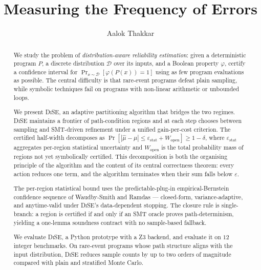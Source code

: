 \documentclass[runningheads]{llncs}
\newcommand{\dist}{\mathcal{D}}
\newcommand{\prog}{P}
\newcommand{\prop}{\varphi}
\newcommand{\mutrue}{\mu}
\newcommand{\muhat}{\hat{\mu}}
\newcommand{\Wopen}{W_{\mathrm{open}}}
\newcommand{\epsstat}{\varepsilon_{\mathrm{stat}}}
\newcommand{\toolname}{\textsc{DiSE}}
\begin{document}
\title{Measuring the Frequency of Errors}

\author{Aalok Thakkar}

\maketitle

\begin{abstract}
  We study the problem of \emph{distribution-aware reliability
    estimation}: given a deterministic program $\prog$, a discrete
  distribution $\dist$ over its inputs, and a Boolean property
  $\prop$, certify a confidence interval for
  $\Pr_{x \sim \dist}[\prop(\prog(x)) = 1]$ using as few program
  evaluations as possible.  The central difficulty is that
  rare-event programs defeat plain sampling, while symbolic
  techniques fail on programs with non-linear arithmetic or
  unbounded loops.

  We present \toolname{}, an adaptive partitioning algorithm that
  bridges the two regimes.
  \toolname{} maintains a frontier of path-condition regions and at
  each step chooses between sampling and SMT-driven refinement under
  a unified gain-per-cost criterion.  The certified half-width
  decomposes as
  $\Pr[|\muhat - \mutrue| \le \epsstat + \Wopen] \ge 1 - \delta$,
  where $\epsstat$ aggregates per-region statistical uncertainty and
  $\Wopen$ is the total probability mass of regions not yet
  symbolically certified.  This decomposition is both the organising
  principle of the algorithm and the content of its central
  correctness theorem: every action reduces one term, and the
  algorithm terminates when their sum falls below $\varepsilon$.

  The per-region statistical bound uses the predictable-plug-in
  empirical-Bernstein confidence sequence of Waudby-Smith and Ramdas
  --- closed-form, variance-adaptive, and anytime-valid under
  \toolname{}'s data-dependent stopping.  The closure rule is
  single-branch: a region is certified if and only if an SMT oracle
  proves path-determinism, yielding a one-lemma soundness contract
  with no sample-based fallback.

  We evaluate \toolname{}, a Python prototype with a
  Z3 backend, and evaluate it on $12$ integer benchmarks.  On
  rare-event programs whose path structure aligns with the input
  distribution, \toolname{} reduces sample counts by up to two orders
  of magnitude compared with plain and stratified Monte Carlo.
\end{abstract}
\end{document}
